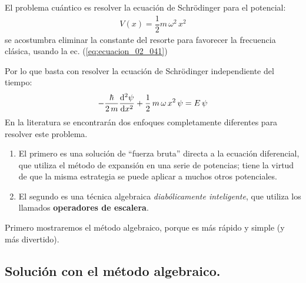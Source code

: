 \documentclass[12pt]{article}
\numberwithin{equation}{section}
\begin{document}
El problema cuántico es resolver la ecuación de Schrödinger para el potencial:
\begin{align}
V(x) = \dfrac{1}{2} m \, \omega^{2} \, x^{2}
\label{eq:ecuacion_02_043}
\end{align}
se acostumbra eliminar la constante del resorte para favorecer la frecuencia clásica, usando la ec. (\ref{eq:ecuacion_02_041})
\par
Por lo que basta con resolver la ecuación de Schrödinger independiente del tiempo:
\begin{align}
- \dfrac{\hbar}{2 \, m} \dv[2]{\psi}{x} + \dfrac{1}{2} \, m \, \omega \, x^{2} \, \psi = E \, \psi
\label{eq:ecuacion_02_044}
\end{align}
En la literatura se encontrarán dos enfoques completamente diferentes para resolver este problema.
\begin{enumerate}
\item El primero es una solución de \enquote{fuerza bruta} directa a la ecuación diferencial, que utiliza el método de expansión en una serie de potencias; tiene la virtud de que la misma estrategia se puede aplicar a muchos otros potenciales.
\item El segundo es una técnica algebraica \emph{diabólicamente inteligente}, que utiliza los llamados \textbf{operadores de escalera}.
\end{enumerate}
Primero mostraremos el método algebraico, porque es más rápido y simple (y más divertido).

\subsection{Solución con el método algebraico.}
\end{document}
